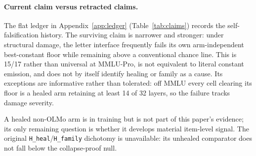 \paragraph{Current claim versus retracted claims.}
The flat ledger in Appendix~\ref{app:ledger} (Table~\ref{tab:claims}) records the self-falsification history. The surviving claim is narrower and stronger: under structural damage, the letter interface frequently fails its own arm-independent best-constant floor while remaining above a conventional chance line. This is 15/17 rather than universal at MMLU-Pro, is not equivalent to literal constant emission, and does not by itself identify healing or family as a cause. Its exceptions are informative rather than tolerated: off MMLU every cell clearing its floor is a healed arm retaining at least 14 of 32 layers, so the failure tracks damage severity.

A healed non-OLMo arm is in training but is not part of this paper's evidence; its only remaining question is whether it develops material item-level signal. The original \texttt{H\_heal}/\texttt{H\_family} dichotomy is unavailable: its unhealed comparator does not fall below the collapse-proof null.
